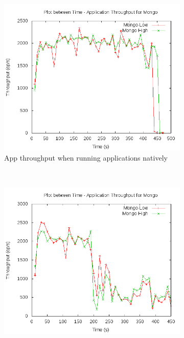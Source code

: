 	\pagebreak
	
	\begin{figure}[t!]
	  \centering
	  \begin{subfigure}[t]{0.48\textwidth}
	    \centering
	    \includegraphics[width=1\textwidth]{images/intro/native.png}
	    \caption{App throughput when running applications natively}
	    \label{plot_intro_native}
	  \end{subfigure}
	  ~ 
	  \begin{subfigure}[t]{0.48\textwidth}
	    \centering
	    \includegraphics[width=1\textwidth]{images/intro/observed.png}

\end{subfigure}
\end{figure}
